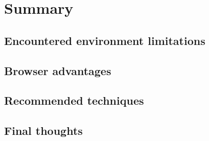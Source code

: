 \chapter{Summary}
\label{cha:summary}

\section{Encountered environment limitations}
\label{sec:limitations}

\section{Browser advantages}
\label{sec:advantages}

\section{Recommended techniques}
\label{sec:recommended}

\section{Final thoughts}
\label{sec:final} 
